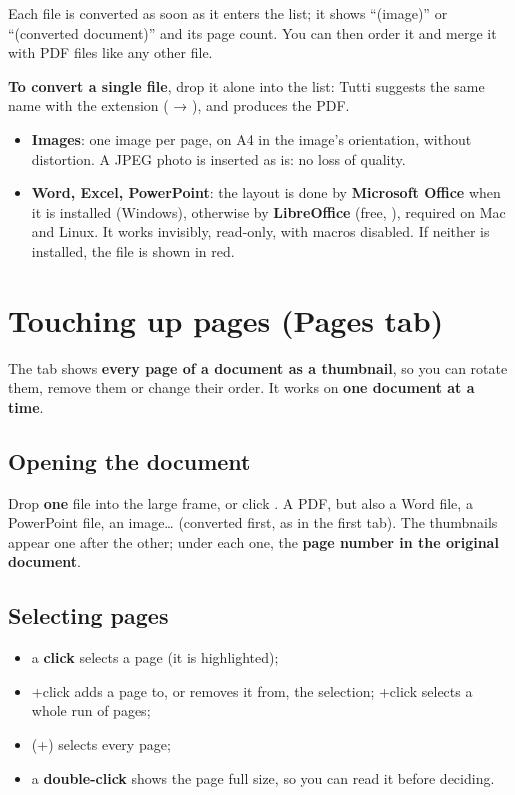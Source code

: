 Each file is converted as soon as it enters the list; it shows “(image)” or “(converted document)”
and its page count. You can then order it and merge it with PDF files like any other file.

\textbf{To convert a single file}, drop it alone into the list: Tutti suggests the same name with
the  extension ( → ), and 
produces the PDF.

\begin{itemize}
\item \textbf{Images}: one image per page, on A4 in the image's orientation, without distortion.
      A JPEG photo is inserted as is: no loss of quality.
\item \textbf{Word, Excel, PowerPoint}: the layout is done by \textbf{Microsoft Office} when it is
      installed (Windows), otherwise by \textbf{LibreOffice} (free, ), required
      on Mac and Linux. It works invisibly, read-only, with macros disabled. If neither is installed,
      the file is shown in red.
\end{itemize}

\section{Touching up pages (Pages tab)}\label{sec:pages}

The  tab shows \textbf{every page of a document as a thumbnail}, so you can rotate them,
remove them or change their order. It works on \textbf{one document at a time}.

\subsection{Opening the document}
Drop \textbf{one} file into the large frame, or click . A PDF, but also a
Word file, a PowerPoint file, an image… (converted first, as in the first tab). The thumbnails
appear one after the other; under each one, the \textbf{page number in the original document}.


\subsection{Selecting pages}
\begin{itemize}
\item a \textbf{click} selects a page (it is highlighted);
\item {}+click adds a page to, or removes it from, the selection; +click
      selects a whole run of pages;
\item {} (+) selects every page;
\item a \textbf{double-click} shows the page full size, so you can read it before deciding.
\end{itemize}

